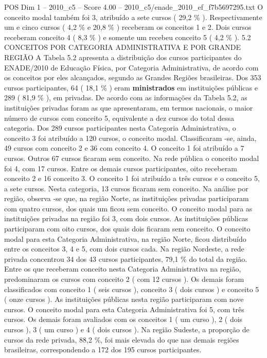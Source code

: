 \begin{textsample}{POS Dim 1 – 2010\_c5 – Score 4.00 – 2010\_c5/enade\_2010\_ef\_f7b5697295.txt}
O conceito modal também foi 3, atribuído a sete cursos ( 29,2 \% ).
Respectivamente um e cinco cursos ( 4,2 \% e 20,8 \% ) receberam os conceitos 1 e 2.
Dois cursos receberam conceito 4 ( 8,3 \% ) e somente um recebeu conceito 5 ( 4,2 \% ). 5.2 CONCEITOS POR CATEGORIA ADMINISTRATIVA E POR GRANDE REGIÃO A Tabela 5.2 apresenta a distribuição dos cursos participantes do ENADE/2010 de Educação Física, por Categoria Administrativa, de acordo com os conceitos por eles alcançados, segundo as Grandes Regiões brasileiras.
Dos 353 cursos participantes, 64 ( 18,1 \% ) eram \textbf{ministrados} em instituições públicas e 289 ( 81,9 \% ), em privadas.
De acordo com as informações da Tabela 5.2, as instituições privadas foram as que apresentaram, em termos nacionais, o maior número de cursos com conceito 5, equivalente a dez cursos do total dessa categoria.
Dos 289 cursos participantes nesta Categoria Administrativa, o conceito 3 foi atribuído a 120 cursos, o conceito modal.
Classificaram -se, ainda, 49 cursos com conceito 2 e 36 com conceito 4.
O conceito 1 foi atribuído a 7 cursos.
Outros 67 cursos ficaram sem conceito.
Na rede pública o conceito modal foi 4, com 17 cursos.
Entre os demais cursos participantes, oito receberam conceito 2 e 16 conceito 3.
O conceito 1 foi atribuído a três cursos e o conceito 5, a sete cursos.
Nesta categoria, 13 cursos ficaram sem conceito.
Na análise por região, observa -se que, na região Norte, as instituições privadas participaram com quatro cursos, dos quais um ficou sem conceito.
O conceito modal para as instituições privadas na região foi 3, com dois cursos.
As instituições públicas participaram com oito cursos, dos quais dois ficaram sem conceito.
O conceito modal para esta Categoria Administrativa, na região Norte, ficou distribuído entre os conceitos 3, 4 e 5, com dois cursos cada.
Na região Nordeste, a rede privada concentrou 34 dos 43 cursos participantes, 79,1 \% do total da região.
Entre os que receberam conceito nesta Categoria Administrativa na região, predominaram os cursos com conceito 2 ( com 12 cursos ).
Os demais foram classificados com conceito 1 ( seis cursos ), conceito 3 ( dois cursos ) e conceito 5 ( onze cursos ).
As instituições públicas nesta região participaram com nove cursos.
O conceito modal para esta Categoria Administrativa foi 5, com três cursos.
Os demais foram avaliados com os conceitos 1 ( um curso ), 2 ( dois cursos ), 3 ( um curso ) e 4 ( dois cursos ).
Na região Sudeste, a proporção de cursos da rede privada, 88,2 \%, foi mais elevada do que nas demais regiões brasileiras, correspondendo a 172 dos 195 cursos participantes.

\end{textsample}
